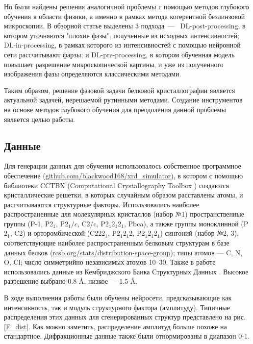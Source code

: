 \documentclass[a4paper,12pt]{article}
\begin{document}
{Но были найдены решения аналогичной проблемы с помощью методов глубокого обучения в области физики, а именно в рамках метода когерентной безлинзовой микроскопии. В обзорной статье \cite{review_physics} выделены 3 подхода~---~ DL-post-processing, в котором уточняются "плохие фазы", полученные из исходных интенсивностей; DL-in-processing, в рамках которого из интенсивностей с помощью нейронной сети рассчитывают фарзы; и DL-pre-processing, в котором обученная модель повышает разрешение микроскопической картины, и уже из полученного изображения фазы определяются классическими методами.

Таким образом, решение фазовой задачи белковой кристаллографии является актуальной задачей, нерешаемой рутинными методами. Создание инструментов на основе методов глубокого обучения для преодоления данной проблемы является целью работы. 


\subsection*{Данные}

Для генерации данных для обучения использовалось собственное программное обеспечение (\url{github.com/blackwood168/xrd_simulator}), в котором с помощью библиотеки CCTBX (Computational Crystallography Toolbox \cite{cctbx}) создаются кристаллические решетки, в которых случайным образом расставлены атомы, и рассчитываются структурные факторы. Использовались наиболее распространенные для молекулярных кристаллов (набор №1) пространственные группы (P-1, P2$_1$, P$2_1/c$, C2/c, P2$_1$2$_1$2$_1$, Pbca), а также группы моноклинной (P$2_1$, C2) и орторомбической (C222$_1$, P2$_1$2$_1$2, P2$_1$2$_1$2$_1$) сингоний (набор №2, 3), соответствующие наиболее распространенным белковым структурам в базе данных белков (\url{rcsb.org/stats/distribution-space-group}); типы атомов --- C, N, O, Cl; число симметрийно независимых атомов 10--30. Также в работе использовались данные из Кембриджского Банка Структурных Данных \cite{csd}. Высокое разрешение выбрано 0.8 Å, низкое --- 1.5 Å.

В ходе выполнения работы были обучены нейросети, предсказывающие как интенсивность, так и модуль структурного фактора (амплитуду). Типичные распределения этих данных для сгенерированных структур представлено на рис. \ref{F_dist}. Как можно заметить, распределение амплитуд больше похоже на стандартное. Дифракционные данные также были отнормированы в диапазон 0-1.

}
\end{document}
